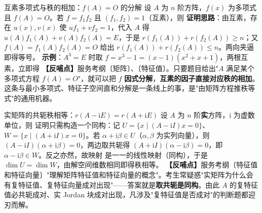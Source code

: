 \begin{fdeep}{互素多项式与秩的相加：$f(A)=O$ 的分解}
设 $A$ 为 $n$ 阶方阵，$f(x)$ 为多项式且 $f(A)=O$。若 $f=f_1f_2$ 且 $(f_1,f_2)=1$（互素），则
\textbf{证明思路}：由互素，存在 $u(x),v(x)$ 使 $u f_1+v f_2=1$，代入 $A$ 得 $u(A)f_1(A)+v(A)f_2(A)=E$，于是 $r(f_1(A))+r(f_2(A))\ge n$；又 $f(A)=f_1(A)f_2(A)=O$ 给出 $r(f_1(A))+r(f_2(A))\le n$。两向夹逼即得等号。
\textbf{示例}：$A^{3}=E$ 时取 $f=x^{3}-1=(x-1)(x^{2}+x+1)$，两根互素，立即得
\textbf{【反哺点】}服务考纲〔矩阵〕、〔特征值〕。只要题目给出"$A$ 满足某个多项式方程 $f(A)=O$"，就可以把 $f$ \textbf{因式分解}，\textbf{互素的因子直接对应秩的相加}。这条与最小多项式、特征子空间直和分解是一条线上的事，是"由矩阵方程推秩等式"的通用机器。
\end{fdeep}


\begin{fdeep}{实矩阵的共轭秩相等：$r(A-\mathrm{i}E)=r(A+\mathrm{i}E)$}
设 $A$ 为 $n$ 阶\textbf{实}方阵，$\mathrm{i}$ 为虚数单位，则
证明只需构造一个同构：记 $U=\{x\mid (A-\mathrm{i}I)x=0\}$、$W=\{x\mid (A+\mathrm{i}I)x=0\}$。若 $\alpha+\mathrm{i}\beta\in U$（$\alpha,\beta$ 为实列向量），则 $(A-\mathrm{i}I)(\alpha+\mathrm{i}\beta)=0$，两边取共轭得 $(A+\mathrm{i}I)(\alpha-\mathrm{i}\beta)=0$，即 $\alpha-\mathrm{i}\beta\in W$。反之亦然，故映射
是一一的线性映射（同构），于是 $\dim U=\dim W$，由解空间维数相同即得秩相等。
\textbf{【反哺点】}服务考纲〔特征值和特征向量〕"理解矩阵特征值和特征向量的概念"。考生常疑惑"实矩阵为什么会有复特征值、复特征向量成对出现"——答案就是\textbf{取共轭是同构}。由此 $A$ 的复特征值必共轭成对、实 Jordan 块成对出现，凡涉及"复特征值是否成对"的判断题都迎刃而解。
\end{fdeep}


